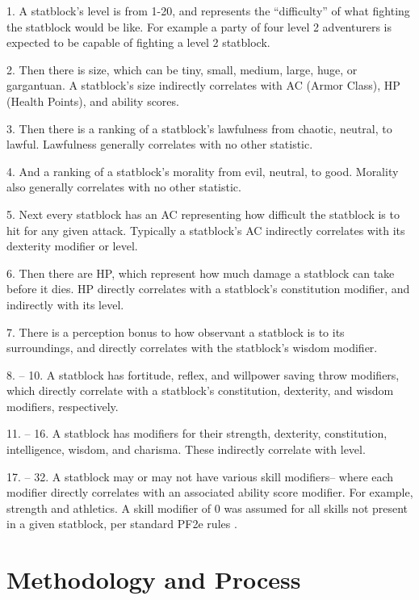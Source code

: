 \documentclass[11pt]{article}
\begin{document}
1. A statblock's level is from 1-20, and represents the ``difficulty'' of what fighting the statblock would be like. For example a party of four level 2 adventurers is expected to be capable of fighting a level 2 statblock.

2. Then there is size, which can be tiny, small, medium, large, huge, or gargantuan. A statblock's size indirectly correlates with AC (Armor Class), HP (Health Points), and ability scores.

3. Then there is a ranking of a statblock's lawfulness from chaotic, neutral, to lawful. Lawfulness generally correlates with no other statistic.

4. And a ranking of a statblock's morality from evil, neutral, to good. Morality also generally correlates with no other statistic.

5. Next every statblock has an AC representing how difficult the statblock is to hit for any given attack. Typically a statblock's AC indirectly correlates with its dexterity modifier or level.

6. Then there are HP, which represent how much damage a statblock can take before it dies. HP directly correlates with a statblock's constitution modifier, and indirectly with its level.

7. There is a perception bonus to how observant a statblock is to its surroundings, and directly correlates with the statblock's wisdom modifier.

8. -- 10. A statblock has fortitude, reflex, and willpower saving throw modifiers, which directly correlate with a statblock's constitution, dexterity, and wisdom modifiers, respectively.

11. -- 16. A statblock has modifiers for their strength, dexterity, constitution, intelligence, wisdom, and charisma. These indirectly correlate with level.

17. -- 32. A statblock may or may not have various skill modifiers-- where each modifier directly correlates with an associated ability score modifier. For example, strength and athletics. A skill modifier of 0 was assumed for all skills not present in a given statblock, per standard PF2e rules \cite{skill_checks}.

\section{Methodology and Process}
\end{document}
